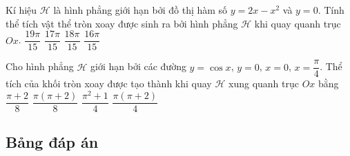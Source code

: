 \begin{ex}%
Kí hiệu $\mathscr{H}$ là hình phẳng giới hạn bởi đồ thị hàm số $y=2x-x^2$ và $y=0$. Tính thể tích vật thể tròn xoay được sinh ra bởi hình phẳng $\mathscr{H}$ khi  quay quanh trục $Ox$.
\choice
{$\dfrac{19\pi}{15}$}
{$\dfrac{17\pi}{15}$}
{$\dfrac{18\pi}{15}$}
{\True $\dfrac{16\pi}{15}$}
\end{ex}
\begin{ex}%
Cho hình phẳng $\mathscr{H}$ giới hạn bởi các đường $y=\cos x$, $y=0$, $x=0$, $x=\dfrac{\pi}{4}$. Thể tích của khối tròn xoay được tạo thành khi quay $\mathscr{H}$ xung quanh trục $Ox$ bằng
\choice
{$\dfrac{\pi+2}{8}$}
{\True $\dfrac{\pi (\pi+2)}{8}$}
{$\dfrac{\pi ^2+1}{4}$}
{$\dfrac{\pi (\pi+2)}{4}$}
\end{ex}

\subsection{Bảng đáp án}

